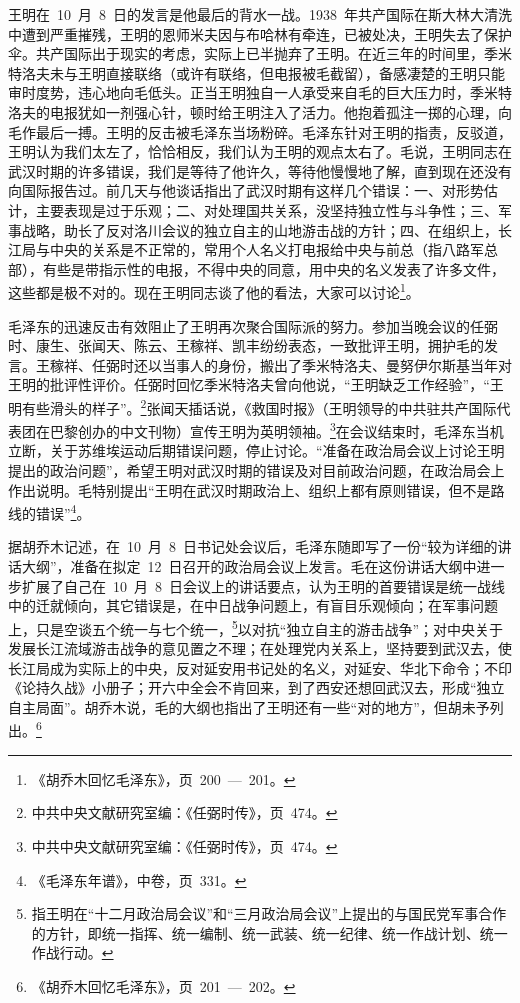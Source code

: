 王明在~10~月~8~日的发言是他最后的背水一战。1938~年共产国际在斯大林大清洗中遭到严重摧残，王明的恩师米夫因与布哈林有牵连，已被处决，王明失去了保护伞。共产国际出于现实的考虑，实际上已半抛弃了王明。在近三年的时间里，季米特洛夫未与王明直接联络（或许有联络，但电报被毛截留），备感凄楚的王明只能审时度势，违心地向毛低头。正当王明独自一人承受来自毛的巨大压力时，季米特洛夫的电报犹如一剂强心针，顿时给王明注入了活力。他抱着孤注一掷的心理，向毛作最后一搏。王明的反击被毛泽东当场粉碎。毛泽东针对王明的指责，反驳道，王明认为我们太左了，恰恰相反，我们认为王明的观点太右了。毛说，王明同志在武汉时期的许多错误，我们是等待了他许久，等待他慢慢地了解，直到现在还没有向国际报告过。前几天与他谈话指出了武汉时期有这样几个错误：一、对形势估计，主要表现是过于乐观；二、对处理国共关系，没坚持独立性与斗争性；三、军事战略，助长了反对洛川会议的独立自主的山地游击战的方针；四、在组织上，长江局与中央的关系是不正常的，常用个人名义打电报给中央与前总（指八路军总部），有些是带指示性的电报，不得中央的同意，用中央的名义发表了许多文件，这些都是极不对的。现在王明同志谈了他的看法，大家可以讨论\footnote{《胡乔木回忆毛泽东》，页~200~—~201。}。

毛泽东的迅速反击有效阻止了王明再次聚合国际派的努力。参加当晚会议的任弼时、康生、张闻天、陈云、王稼祥、凯丰纷纷表态，一致批评王明，拥护毛的发言。王稼祥、任弼时还以当事人的身份，搬出了季米特洛夫、曼努伊尔斯基当年对王明的批评性评价。任弼时回忆季米特洛夫曾向他说，“王明缺乏工作经验”，“王明有些滑头的样子”。\footnote{中共中央文献研究室编：《任弼时传》，页~474。}张闻天插话说，《救国时报》（王明领导的中共驻共产国际代表团在巴黎创办的中文刊物）宣传王明为英明领袖。\footnote{中共中央文献研究室编：《任弼时传》，页~474。}在会议结束时，毛泽东当机立断，关于苏维埃运动后期错误问题，停止讨论。“准备在政治局会议上讨论王明提出的政治问题”，希望王明对武汉时期的错误及对目前政治问题，在政治局会上作出说明。毛特别提出“王明在武汉时期政治上、组织上都有原则错误，但不是路线的错误”\footnote{《毛泽东年谱》，中卷，页~331。}。

据胡乔木记述，在~10~月~8~日书记处会议后，毛泽东随即写了一份“较为详细的讲话大纲”，准备在拟定~12~日召开的政治局会议上发言。毛在这份讲话大纲中进一步扩展了自己在~10~月~8~日会议上的讲话要点，认为王明的首要错误是统一战线中的迁就倾向，其它错误是，在中日战争问题上，有盲目乐观倾向；在军事问题上，只是空谈五个统一与七个统一，\footnote{指王明在“十二月政治局会议”和“三月政治局会议”上提出的与国民党军事合作的方针，即统一指挥、统一编制、统一武装、统一纪律、统一作战计划、统一作战行动。}以对抗“独立自主的游击战争”；对中央关于发展长江流域游击战争的意见置之不理；在处理党内关系上，坚持要到武汉去，使长江局成为实际上的中央，反对延安用书记处的名义，对延安、华北下命令；不印《论持久战》小册子；开六中全会不肯回来，到了西安还想回武汉去，形成“独立自主局面”。胡乔木说，毛的大纲也指出了王明还有一些“对的地方”，但胡未予列出。\footnote{《胡乔木回忆毛泽东》，页~201~—~202。}

